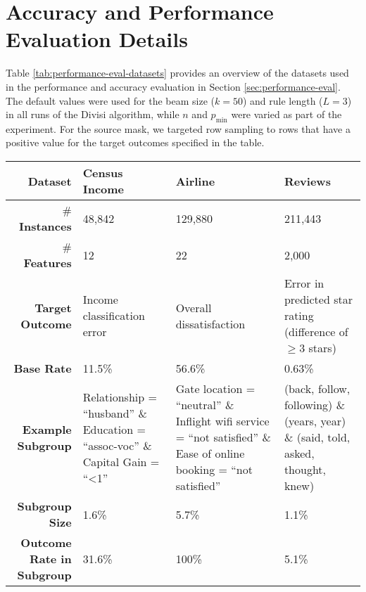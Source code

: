\section{Accuracy and Performance Evaluation Details}
\label{app:perf-evaluation-details}
Table \ref{tab:performance-eval-datasets} provides an overview of the datasets used in the performance and accuracy evaluation in Section \ref{sec:performance-eval}.
The default values were used for the beam size ($k = 50$) and rule length ($L = 3$) in all runs of the Divisi algorithm, while $n$ and $p_\text{min}$ were varied as part of the experiment.
For the source mask, we targeted row sampling to rows that have a positive value for the target outcomes specified in the table.

\begin{table*} \small
\begin{tabular}{rp{3.2cm}p{3.2cm}p{3.2cm}}
\toprule
\textbf{Dataset} & \textbf{Census Income} & \textbf{Airline} & \textbf{Reviews} \\ \midrule
\# \textbf{Instances} & 48,842 & 129,880 & 211,443 \\
\# \textbf{Features} & 12 & 22 & 2,000 \\
\textbf{Target Outcome} & Income classification error & Overall dissatisfaction & Error in predicted star rating (difference of $\geq 3$ stars) \\
\textbf{Base Rate} & 11.5\% & 56.6\% & 0.63\% \\
\midrule
\textbf{Example Subgroup} & Relationship = ``husband'' \& Education = ``assoc-voc'' \& Capital Gain = ``\textless 1'' & Gate location = ``neutral'' \& Inflight wifi service = ``not satisfied'' \& Ease of online booking = ``not satisfied'' & (back, follow, following) \& (years, year) \& (said, told, asked, thought, knew) \\
\textbf{Subgroup Size} & 1.6\% & 5.7\% & 1.1\% \\
\textbf{Outcome Rate in Subgroup} & 31.6\% & 100\% & 5.1\% \\
\bottomrule
\end{tabular}
\caption{Datasets used to evaluate the running time and accuracy of Divisi, and examples of subgroups returned by the Divisi algorithm for each task.}
\label{tab:performance-eval-datasets}
\end{table*}

